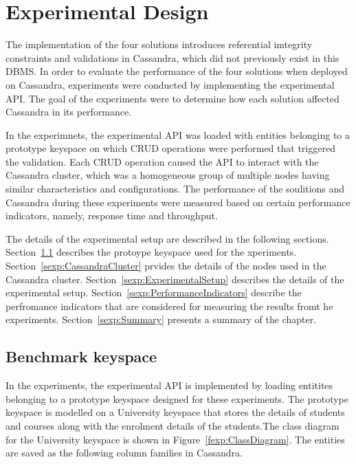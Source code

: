 \chapter{Experimental Design}


The implementation of the four solutions  introduces referential imtegrity
constraints and validations in Cassandra, which did not previously exist in this
\ac{DBMS}. In order to evaluate the performance of the four solutions when
deployed on Cassandra, experiments were conducted by implementing the
experimental \ac{API}. The goal of the experiments were to determine how each
solution affected Cassandra in its performance.

 In the experimnets, the experimental \ac{API} was loaded with entities
 belonging to a prototype keyspace  on which \ac{CRUD} operations were performed
 that triggered the validation. Each \ac{CRUD} operation caused the \ac{API} to
 interact with the Cassandra cluster, which was  a homogeneous group of multiple
 nodes having similar characteristics and configurations. The performance of the
 soulitions and Cassandra during these experiments  were measured based on
 certain performance indicators, namely, response time and throughput.

The details of the experimental setup are described in the following sections.
Section~\ref{sexp:BenchmarkKeyspace} describes the protoype keyspace used for
the xperiments. Section~\ref{sexp:CassandraCluster} prvides the details of the
nodes used in the Cassandra cluster. Section~\ref{sexp:ExperimentalSetup}
describes the details of the experimental setup.
Section~\ref{sexp:PerformanceIndicators} describe the perfromance indicators
that are considered for measuring the results fromt he experiments.
Section~\ref{sexp:Summary} presents a summary of the chapter.


\section{Benchmark keyspace} \label{sexp:BenchmarkKeyspace}
In the experiments, the experimental \ac{API} is implemented by loading
entitites belonging to a prototype keyspace designed for these experiments. The
prototype keyspace is modelled on a University keyspace that stores the details
of students and courses along with the enrolment details of the students.The
class diagram for the University keyspace is shown in
Figure~\ref{fexp:ClassDiagram}. The entities are saved as the following column
families in Cassandra.


